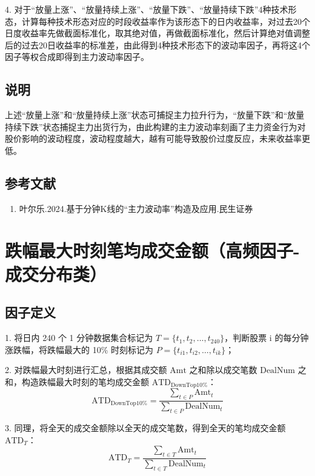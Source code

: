 \documentclass{article}
\begin{document}
4. 对于“放量上涨”、“放量持续上涨”、“放量下跌”、“放量持续下跌”4种技术形态，计算每种技术形态对应的时段收益率作为该形态下的日内收益率，对过去20个日度收益率先做截面标准化，取其绝对值，再做截面标准化，然后计算绝对值调整后的过去20日收益率的标准差，由此得到4种技术形态下的波动率因子，再将这4个因子等权合成即得到主力波动率因子。

\subsection{说明}
上述“放量上涨”和“放量持续上涨”状态可捕捉主力拉升行为，“放量下跌”和“放量持续下跌”状态捕捉主力出货行为，由此构建的主力波动率刻画了主力资金行为对股价影响的波动程度，波动程度越大，越有可能导致股价过度反应，未来收益率更低。

\subsection{参考文献}
\begin{enumerate}
    \item 叶尔乐.2024.基于分钟K线的“主力波动率”构造及应用.民生证券
\end{enumerate}

\section{跌幅最大时刻笔均成交金额（高频因子-成交分布类）}

\subsection{因子定义}

1. 将日内 240 个 1 分钟数据集合标记为 \( T = \{t_1, t_2, \dots, t_{240}\} \)，判断股票 i 的每分钟涨跌幅，将跌幅最大的 10\% 时刻标记为 \( P = \{t_{i1}, t_{i2}, \dots, t_{ik}\} \)；

2. 对跌幅最大时刻进行汇总，根据其成交额 \( \mathrm{Amt} \) 之和除以成交笔数 \( \mathrm{DealNum} \) 之和，构造跌幅最大时刻的笔均成交金额 \( \mathrm{ATD}_{\mathrm{DownTop10\%}} \)：
\begin{equation}
    \mathrm{ATD}_{\mathrm{DownTop10\%}} = \frac{\sum_{t \in P} \mathrm{Amt}_t}{\sum_{t \in P} \mathrm{DealNum}_t}
\end{equation}

3. 同理，将全天的成交金额除以全天的成交笔数，得到全天的笔均成交金额 \( \mathrm{ATD}_T \)：
\begin{equation}
    \mathrm{ATD}_T = \frac{\sum_{t \in T} \mathrm{Amt}_t}{\sum_{t \in T} \mathrm{DealNum}_t}
\end{equation}
\end{document}
